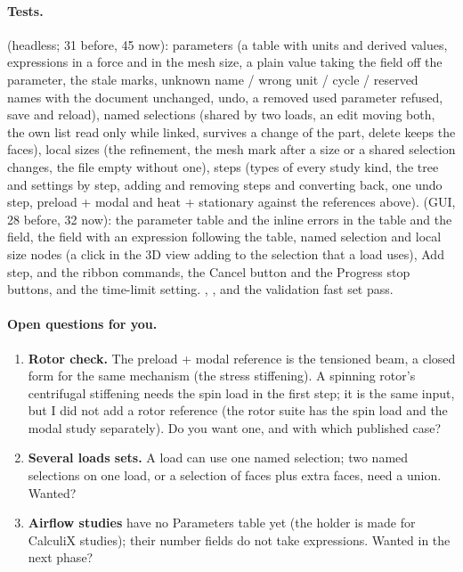 \paragraph{Tests.}  (headless; 31 before, 45 now): parameters (a table with units and
derived values, expressions in a force and in the mesh size, a plain value taking the field off the parameter,
the stale marks, unknown name / wrong unit / cycle / reserved names with the document unchanged, undo, a removed
used parameter refused, save and reload), named selections (shared by two loads, an edit moving both, the own list read
only while linked, survives a change of the part, delete keeps the faces), local sizes (the refinement, the mesh mark
after a size or a shared selection changes, the file empty without one), steps (types of every study kind, the tree and
settings by step, adding and removing steps and converting back, one undo step, preload + modal and heat + stationary
against the references above).  (GUI, 28 before, 32 now): the parameter table and
the inline errors in the table and the field, the field with an expression following the table, named selection and local size
nodes (a click in the 3D view adding to the selection that a load uses), Add step, and the ribbon commands, the Cancel button and the Progress stop buttons, and the time-limit setting.
, ,  and the validation fast set pass.

\paragraph{Open questions for you.}
\begin{enumerate}[nosep]
  \item \textbf{Rotor check.} The preload + modal reference is the tensioned beam, a closed form for the same mechanism (the
        stress stiffening). A spinning rotor's centrifugal stiffening needs the spin load in the first step; it is the same
        input, but I did not add a rotor reference (the rotor suite has the spin load and the modal study separately).
        Do you want one, and with which published case?
  \item \textbf{Several loads sets.} A load can use one named selection; two named selections on one load, or a selection of
        faces plus extra faces, need a union. Wanted?
  \item \textbf{Airflow studies} have no Parameters table yet (the holder is made for CalculiX studies); their number fields do not take
        expressions. Wanted in the next phase?
\end{enumerate}
